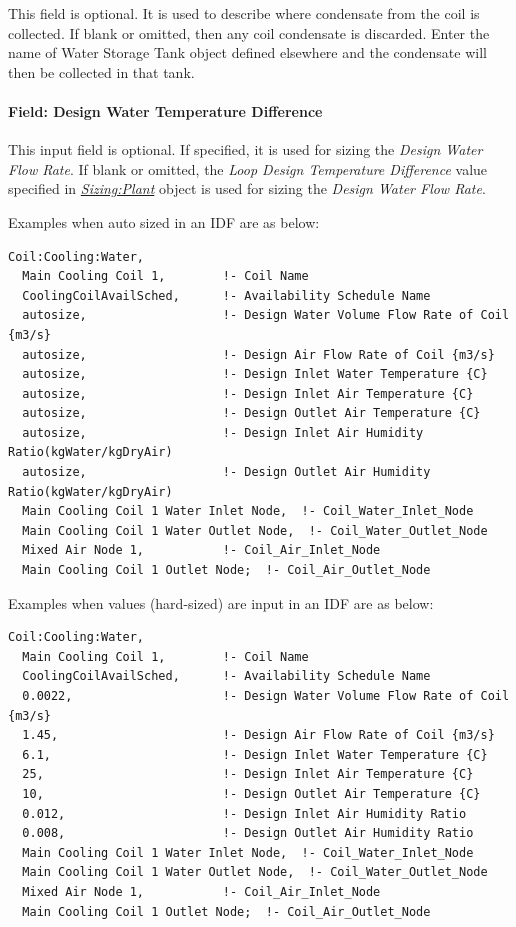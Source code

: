 This field is optional. It is used to describe where condensate from the coil is collected. If blank or omitted, then any coil condensate is discarded. Enter the name of Water Storage Tank object defined elsewhere and the condensate will then be collected in that tank.

\paragraph{Field: Design Water Temperature Difference}

This input field is optional. If specified, it is used for sizing the \textit{Design Water Flow Rate}. If blank or omitted, the \textit{Loop Design Temperature Difference} value specified in \textit{\hyperref[sizingplant]{Sizing:Plant}} object is used for sizing the \textit{Design Water Flow Rate}.

Examples when auto sized in an IDF are as below:

\begin{lstlisting}
Coil:Cooling:Water,
  Main Cooling Coil 1,        !- Coil Name
  CoolingCoilAvailSched,      !- Availability Schedule Name
  autosize,                   !- Design Water Volume Flow Rate of Coil {m3/s}
  autosize,                   !- Design Air Flow Rate of Coil {m3/s}
  autosize,                   !- Design Inlet Water Temperature {C}
  autosize,                   !- Design Inlet Air Temperature {C}
  autosize,                   !- Design Outlet Air Temperature {C}
  autosize,                   !- Design Inlet Air Humidity Ratio(kgWater/kgDryAir)
  autosize,                   !- Design Outlet Air Humidity Ratio(kgWater/kgDryAir)
  Main Cooling Coil 1 Water Inlet Node,  !- Coil_Water_Inlet_Node
  Main Cooling Coil 1 Water Outlet Node,  !- Coil_Water_Outlet_Node
  Mixed Air Node 1,           !- Coil_Air_Inlet_Node
  Main Cooling Coil 1 Outlet Node;  !- Coil_Air_Outlet_Node
\end{lstlisting}

Examples when values (hard-sized) are input in an IDF are as below:

\begin{lstlisting}
Coil:Cooling:Water,
  Main Cooling Coil 1,        !- Coil Name
  CoolingCoilAvailSched,      !- Availability Schedule Name
  0.0022,                     !- Design Water Volume Flow Rate of Coil {m3/s}
  1.45,                       !- Design Air Flow Rate of Coil {m3/s}
  6.1,                        !- Design Inlet Water Temperature {C}
  25,                         !- Design Inlet Air Temperature {C}
  10,                         !- Design Outlet Air Temperature {C}
  0.012,                      !- Design Inlet Air Humidity Ratio
  0.008,                      !- Design Outlet Air Humidity Ratio
  Main Cooling Coil 1 Water Inlet Node,  !- Coil_Water_Inlet_Node
  Main Cooling Coil 1 Water Outlet Node,  !- Coil_Water_Outlet_Node
  Mixed Air Node 1,           !- Coil_Air_Inlet_Node
  Main Cooling Coil 1 Outlet Node;  !- Coil_Air_Outlet_Node
\end{lstlisting}

